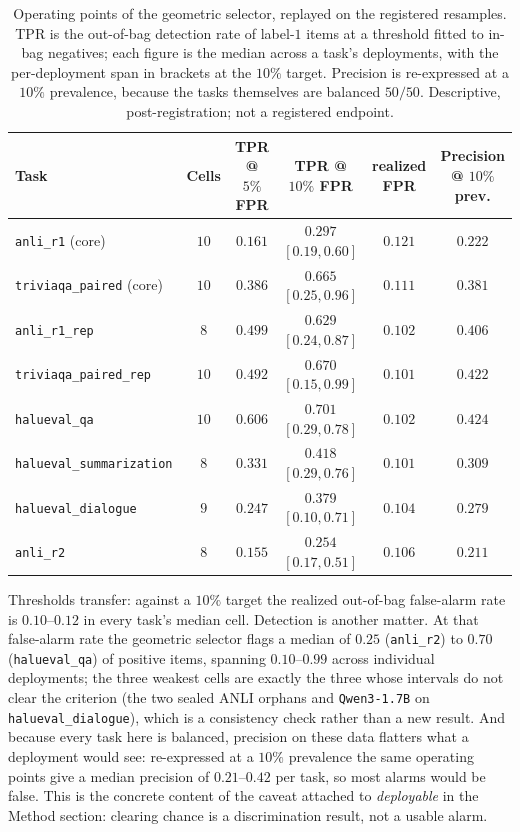 \documentclass[11pt]{article}
\begin{document}
\begin{table}[tbp]
\centering\small
\caption{Operating points of the geometric selector, replayed on the registered resamples. TPR is
the out-of-bag detection rate of label-$1$ items at a threshold fitted to in-bag negatives; each
figure is the median across a task's deployments, with the per-deployment span in brackets at the
$10\%$ target. Precision is re-expressed at a $10\%$ prevalence, because the tasks themselves are
balanced $50/50$. Descriptive, post-registration; not a registered endpoint.}
\label{tab:oppoints}
\begin{tabular}{@{}lccccc@{}}
\toprule
Task & Cells & TPR @ $5\%$ FPR & TPR @ $10\%$ FPR & realized FPR & Precision @ $10\%$ prev. \\
\midrule
\texttt{anli\_r1} (core)         & $10$ & $0.161$ & $0.297$ $[0.19,0.60]$ & $0.121$ & $0.222$ \\
\texttt{triviaqa\_paired} (core) & $10$ & $0.386$ & $0.665$ $[0.25,0.96]$ & $0.111$ & $0.381$ \\
\texttt{anli\_r1\_rep}           & $8$  & $0.499$ & $0.629$ $[0.24,0.87]$ & $0.102$ & $0.406$ \\
\texttt{triviaqa\_paired\_rep}   & $10$ & $0.492$ & $0.670$ $[0.15,0.99]$ & $0.101$ & $0.422$ \\
\texttt{halueval\_qa}            & $10$ & $0.606$ & $0.701$ $[0.29,0.78]$ & $0.102$ & $0.424$ \\
\texttt{halueval\_summarization} & $8$  & $0.331$ & $0.418$ $[0.29,0.76]$ & $0.101$ & $0.309$ \\
\texttt{halueval\_dialogue}      & $9$  & $0.247$ & $0.379$ $[0.10,0.71]$ & $0.104$ & $0.279$ \\
\texttt{anli\_r2}                & $8$  & $0.155$ & $0.254$ $[0.17,0.51]$ & $0.106$ & $0.211$ \\
\bottomrule
\end{tabular}
\end{table}

Thresholds transfer: against a $10\%$ target the realized out-of-bag false-alarm rate is
$0.10$--$0.12$ in every task's median cell. Detection is another matter. At that false-alarm rate the
geometric selector flags a median of $0.25$ (\texttt{anli\_r2}) to $0.70$ (\texttt{halueval\_qa}) of
positive items, spanning $0.10$--$0.99$ across individual deployments; the three weakest cells are
exactly the three whose intervals do not clear the criterion (the two sealed ANLI orphans and
\texttt{Qwen3-1.7B} on \texttt{halueval\_dialogue}), which is a consistency check rather than a new
result. And because every task here is balanced, precision on these data flatters what a deployment
would see: re-expressed at a $10\%$ prevalence the same operating points give a median precision of
$0.21$--$0.42$ per task, so most alarms would be false. This is the concrete content of the caveat
attached to \emph{deployable} in the Method section: clearing chance is a discrimination result, not
a usable alarm.
\end{document}
